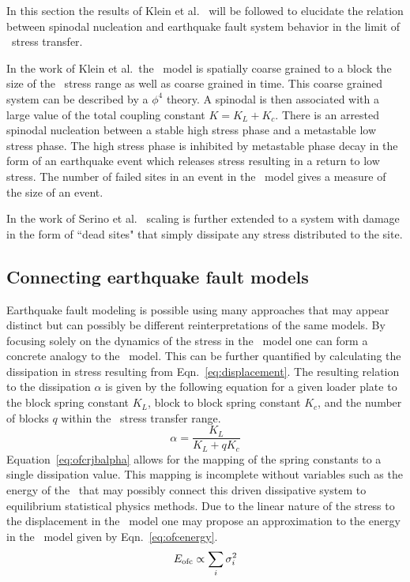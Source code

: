 In this section the results of Klein et al.~\cite{kleinferg13} will be followed to elucidate the relation between spinodal nucleation and earthquake fault system behavior in the limit of \lr\ stress transfer. 

In the work of Klein et al.\ the \rjb\ model is spatially coarse grained to a block the size of the \lr\ stress range as well as coarse grained in time. This coarse grained system can be described by a $\phi^4$ theory. A spinodal is then associated with a large value of the total coupling constant $K=K_L+K_c$. There is an arrested   spinodal nucleation between a stable high stress phase and a metastable low stress phase. The high stress phase is inhibited by  metastable phase decay in the form of an earthquake event which releases stress resulting in a return to low stress. The number of failed sites in an event in the \rjb\ model  gives a measure of the size of an event.

In the work of Serino et al.~\cite{serino11}  scaling  is further extended to a system with damage in the form of ``dead sites" that simply dissipate any stress distributed to the site.

\subsection{Connecting earthquake fault models}

Earthquake fault modeling is possible using many approaches that may appear distinct but can possibly be different reinterpretations of the same models. By focusing solely on the dynamics of the stress in the \rjb\ model one can form a concrete analogy to the \ofc\ model. This can be further quantified by calculating the dissipation in stress resulting from Eqn.~\eqref{eq:displacement}. The resulting relation to the dissipation $\alpha$ is given by the following equation for a given loader plate to the block spring constant $K_L$, block to block spring constant $K_c$, and the number of blocks $q$ within the \lr\ stress transfer range.  %
\begin{equation}
 \label{eq:ofcrjbalpha}
	\alpha = \frac{K_L}{K_L + qK_c}
\end{equation}%
Equation~\eqref{eq:ofcrjbalpha} allows for the mapping of the spring constants to  a single dissipation value. This mapping is incomplete without  variables such as the energy of the \ofc\ that may possibly connect this driven dissipative system to equilibrium statistical physics methods. Due to the linear nature of the stress to the displacement in the \rjb\ model one may propose an approximation to the energy in the \ofc\ model given by Eqn.~\eqref{eq:ofcenergy}.   %
\begin{equation}
 \label{eq:ofcenergy}
	E_{\rm ofc} \propto \sum_i \sigma_i^2
\end{equation}%


